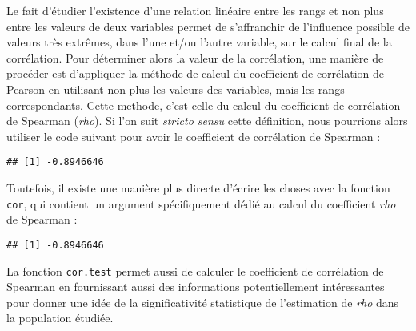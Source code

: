 \documentclass[
  french,
]{book}
\newenvironment{Shaded}{\begin{snugshade}}{\end{snugshade}}
\newcommand{\DataTypeTok}[1]{\textcolor[rgb]{0.13,0.29,0.53}{#1}}
\newcommand{\KeywordTok}[1]{\textcolor[rgb]{0.13,0.29,0.53}{\textbf{#1}}}
\newcommand{\NormalTok}[1]{#1}
\newcommand{\OperatorTok}[1]{\textcolor[rgb]{0.81,0.36,0.00}{\textbf{#1}}}
\newcommand{\StringTok}[1]{\textcolor[rgb]{0.31,0.60,0.02}{#1}}
\begin{document}
Le fait d'étudier l'existence d'une relation linéaire entre les rangs et non plus entre les valeurs de deux variables permet de s'affranchir de l'influence possible de valeurs très extrêmes, dans l'une et/ou l'autre variable, sur le calcul final de la corrélation. Pour déterminer alors la valeur de la corrélation, une manière de procéder est d'appliquer la méthode de calcul du coefficient de corrélation de Pearson en utilisant non plus les valeurs des variables, mais les rangs correspondants. Cette methode, c'est celle du calcul du coefficient de corrélation de Spearman (\emph{rho}). Si l'on suit \emph{stricto sensu} cette définition, nous pourrions alors utiliser le code suivant pour avoir le coefficient de corrélation de Spearman :

\begin{Shaded}
\end{Shaded}

\begin{verbatim}
## [1] -0.8946646
\end{verbatim}

Toutefois, il existe une manière plus directe d'écrire les choses avec la fonction \texttt{cor}, qui contient un argument spécifiquement dédié au calcul du coefficient \emph{rho} de Spearman :

\begin{Shaded}
\end{Shaded}

\begin{verbatim}
## [1] -0.8946646
\end{verbatim}

La fonction \texttt{cor.test} permet aussi de calculer le coefficient de corrélation de Spearman en fournissant aussi des informations potentiellement intéressantes pour donner une idée de la significativité statistique de l'estimation de \emph{rho} dans la population étudiée.
\end{document}
